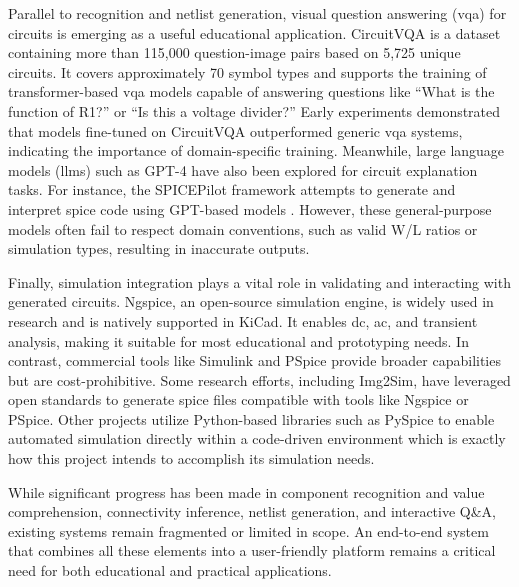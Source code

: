 Parallel to recognition and netlist generation, visual question answering (\gls{vqa}) for circuits is emerging as a useful educational application. CircuitVQA is a dataset containing more than 115,000 question-image pairs based on 5,725 unique circuits. It covers approximately 70 symbol types and supports the training of transformer-based \gls{vqa} models capable of answering questions like ``What is the function of R1?'' or ``Is this a voltage divider?'' Early experiments demonstrated that models fine-tuned on CircuitVQA outperformed generic \gls{vqa} systems, indicating the importance of domain-specific training. Meanwhile, large language models (\glspl{llm}) such as GPT-4 have also been explored for circuit explanation tasks. For instance, the SPICEPilot framework attempts to generate and interpret \gls{spice} code using GPT-based models \cite{vungarala2024spicepilot}. However, these general-purpose models often fail to respect domain conventions, such as valid W/L ratios or simulation types, resulting in inaccurate outputs.



Finally, simulation integration plays a vital role in validating and interacting with generated circuits. Ngspice, an open-source simulation engine, is widely used in research and is natively supported in KiCad. It enables \gls{dc}, \gls{ac}, and transient analysis, making it suitable for most educational and prototyping needs. In contrast, commercial tools like Simulink and PSpice provide broader capabilities but are cost-prohibitive. Some research efforts, including Img2Sim, have leveraged open standards to generate \gls{spice} files compatible with tools like Ngspice or PSpice. Other projects utilize Python-based libraries such as PySpice to enable automated simulation directly within a code-driven environment which is exactly how this project intends to accomplish its simulation needs.



While significant progress has been made in component recognition and value comprehension, connectivity inference, netlist generation, and interactive Q\&A, existing systems remain fragmented or limited in scope. An end-to-end system that combines all these elements into a user-friendly platform remains a critical need for both educational and practical applications.